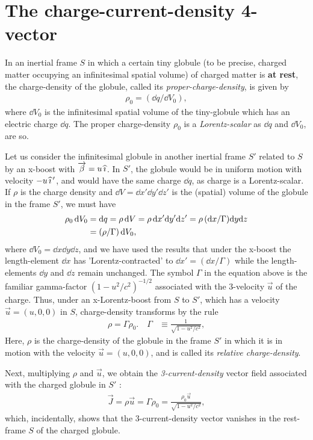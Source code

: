 \section{The charge-current-density 4-vector}
In an inertial frame $S$ in which a certain tiny 
globule (to be precise, charged matter occupying an 
infinitesimal spatial volume) of charged matter is 
\textbf{at rest}, the charge-density of the globule, 
called its \textsl{proper-charge-density}, is given by
\begin{align}\label{ved.5}
 \rho_0 =(\dd q/ \dd V_0 ),
\end{align}
where $\dd V_0$ is the infinitesimal spatial volume of the 
tiny-globule which has an electric charge $\dd q$.  The 
proper  charge-density $\rho_0$ is  a 
\textsl{Lorentz-scalar} as $\dd q$ and $\dd V_0 $, are so. 

Let us consider the infinitesimal globule in another 
inertial frame $S'$ related to $S$ by an x-boost with 
$\overrightarrow{{\beta}}=u\,{\widehat{\imath}}$. In $S'$, the globule would be 
in uniform motion with velocity $-u\,{\widehat{\imath}}\,'$, and 
would have the same charge $\dd q$, as charge is a 
Lorentz-scalar. If $\rho$ is the charge density and $\dd V= 
\dd x'\dd y'\dd z'$ is the (spatial) volume of the globule 
in the frame $S'$, we must have
\begin{align*}
\rho_0\,\mathrm{d} V_0&=\mathrm{d} q= \rho\,\mathrm{d} V= \rho\,\mathrm{d} x'\mathrm{d} y'\mathrm{d} 
z'=\rho\,(\mathrm{d} x/\Gamma)\mathrm{d} y\mathrm{d} z\notag\\& 
=(\rho/\Gamma)\,\mathrm{d} V_0,
\end{align*}
where $\dd V_0=\dd x\dd y\dd z$, and  we have used the 
results that under the x-boost the length-element $\dd x$ 
has 'Lorentz-contracted' to $\dd x'=(\dd x/\Gamma)$ while 
the length-elements $\dd y$ and $\dd z$ remain unchanged. 
The symbol $\Gamma$ in the equation above 
is the familiar gamma-factor $(1-u^2/c^2)^{-1/2}$ associated 
with the 3-velocity $\vec{u}$ of the charge. Thus, under an  
x-Lorentz-boost  from $S$ to $S'$,  which has a velocity 
$\vec{u}=(u,0,0)$ in $S$,  charge-density transforms by the 
rule
\begin{align}\label{ved.6}
\rho=\Gamma\rho_0.\quad \Gamma&\equiv 
\frac{1}{\sqrt{1-u^2/c^2}},
\end{align}
Here, $\rho$ is the charge-density of the globule in the 
frame $S'$ in which it is in motion with the velocity 
$\vec{u}=(u,0,0)$, and is called its \textsl{relative 
charge-density}.

Next, multiplying $\rho$ and $\vec{u}$, we obtain the 
\textsl{3-current-density} vector field associated with the 
charged globule in $S'$ : 
\begin{align}\label{ved.7}
\vec{J}=\rho\vec{u}=\Gamma \rho_0=\frac{\rho_0\vec{u}}
{\sqrt{1-u^2/c^2}},
\end{align}
which, incidentally, shows that the 3-current-density vector 
vanishes in  the rest-frame $S$ of the charged globule.

